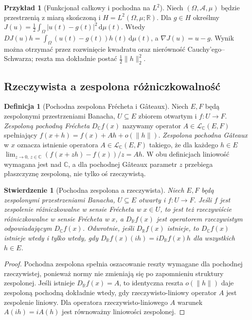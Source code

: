 \documentclass[11pt,a4paper]{article}
\numberwithin{equation}{section}
\theoremstyle{plain}
\newtheorem{stwierdzenie}[twierdzenie]{Stwierdzenie}
\theoremstyle{definition}
\newtheorem{definicja}[twierdzenie]{Definicja}
\newtheorem{przyklad}[twierdzenie]{Przykład}
\theoremstyle{remark}
\newcommand{\R}{\mathbb R}
\newcommand{\C}{\mathbb C}
\begin{document}
\begin{przyklad}[Funkcjonał całkowy i pochodna na $L^2$]
\label{ex:integral-functional14}
Niech $(\Omega,\mathcal A,\mu)$ będzie przestrzenią z miarą skończoną i $H=L^2(\Omega,\mu;\R)$. Dla $g\in H$ określmy $J(u)=\frac12\int_\Omega |u(t)-g(t)|^2\,\mathrm d\mu(t)$. Wtedy
$DJ(u)h=\int_\Omega (u(t)-g(t))h(t)\,\mathrm d\mu(t)$,
a $\nabla J(u)=u-g$. Wynik można otrzymać przez rozwinięcie kwadratu oraz nierówność Cauchy'ego--Schwarza; reszta ma dokładnie postać $\frac12\|h\|_2^2$.
\end{przyklad}

\subsection{Rzeczywista a zespolona różniczkowalność}

\begin{definicja}[Pochodna zespolona Frécheta i Gâteaux]
\label{def:complex-differentiability14}
Niech $E,F$ będą zespolonymi przestrzeniami Banacha, $U\subseteq E$ zbiorem otwartym i $f:U\to F$. \emph{Zespoloną pochodną Frécheta} $D_{\C}f(x)$ nazywamy operator $A\in\mathcal L_{\C}(E,F)$ spełniający $f(x+h)=f(x)+Ah+o(\|h\|)$. \emph{Zespolona pochodna Gâteaux} w $x$ oznacza istnienie operatora $A\in\mathcal L_{\C}(E,F)$ takiego, że dla każdego $h\in E$
$\lim_{z\to0,\,z\in\C}(f(x+zh)-f(x))/z=Ah$.
W obu definicjach liniowość wymagana jest nad $\C$, a dla pochodnej Gâteaux parametr $z$ przebiega płaszczyznę zespoloną, nie tylko oś rzeczywistą.
\end{definicja}

\begin{stwierdzenie}[Pochodna zespolona a rzeczywista]
\label{prop:complex-real14}
Niech $E,F$ będą zespolonymi przestrzeniami Banacha, $U\subseteq E$ otwarty i $f:U\to F$. Jeśli $f$ jest zespolenie różniczkowalne w sensie Frécheta w $x\in U$, to jest też rzeczywiście różniczkowalne w sensie Frécheta w $x$, a $D_{\R}f(x)$ jest operatorem rzeczywistym odpowiadającym $D_{\C}f(x)$. Odwrotnie, jeśli $D_{\R}f(x)$ istnieje, to $D_{\C}f(x)$ istnieje wtedy i tylko wtedy, gdy $D_{\R}f(x)(ih)=iD_{\R}f(x)h$ dla wszystkich $h\in E$.
\end{stwierdzenie}
\begin{proof}
Pochodna zespolona spełnia oszacowanie reszty wymagane dla pochodnej rzeczywistej, ponieważ normy nie zmieniają się po zapomnieniu struktury zespolonej. Jeśli istnieje $D_{\R}f(x)=A$, to identyczna reszta $o(\|h\|)$ daje zespoloną pochodną dokładnie wtedy, gdy rzeczywisto-liniowy operator $A$ jest zespolenie liniowy. Dla operatora rzeczywisto-liniowego $A$ warunek $A(ih)=iA(h)$ jest równoważny liniowości zespolonej.
\end{proof}
\end{document}
